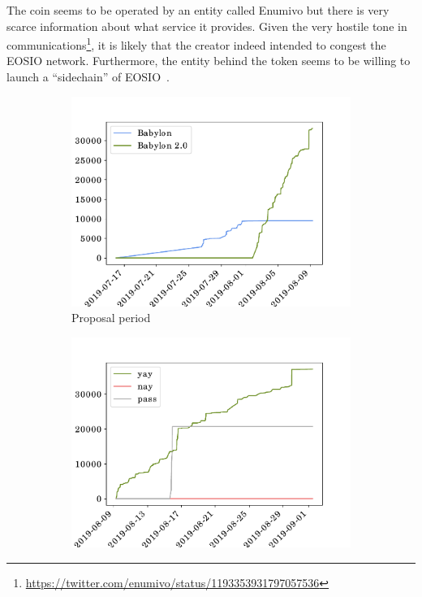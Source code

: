 The coin seems to be operated by an entity called Enumivo but there is very scarce information about what service it provides. Given the very hostile tone in communications\footnote{\url{https://twitter.com/enumivo/status/1193353931797057536}}, it is likely that the creator indeed intended to congest the EOSIO network. Furthermore, the entity behind the  token seems to be willing to launch a ``sidechain'' of EOSIO~\cite{yas-network}.

\begin{figure}[tb]
  \centering
  \begin{subfigure}{0.323\textwidth}
    \centering
    \includegraphics[width=\columnwidth]{./4-transactions-security/figures/babylon-proposals.pdf}
    \caption{Proposal period}
  \end{subfigure}
  \begin{subfigure}{0.323\textwidth}
    \centering
    \includegraphics[width=\columnwidth]{./4-transactions-security/figures/babylon-exploration.pdf}

\end{subfigure}
\end{figure}
